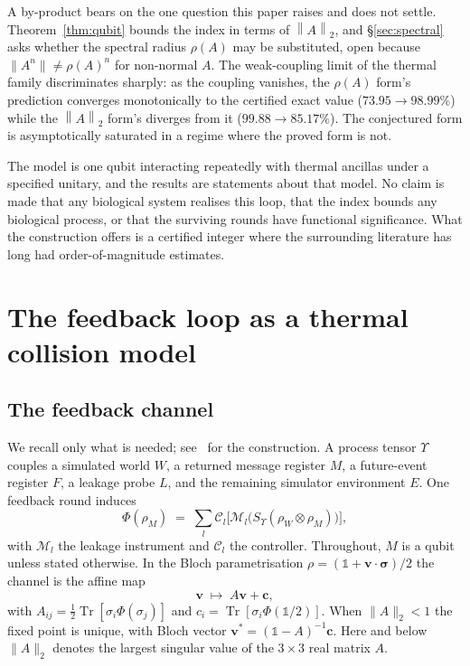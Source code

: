 \documentclass[11pt,a4paper]{article}
\theoremstyle{definition}
\theoremstyle{remark}
\DeclareMathOperator{\Tr}{Tr}
\newcommand{\openone}{\mathbb{1}}%
\newcommand{\opn}[1]{\left\lVert #1 \right\rVert_{2}}
\begin{document}
A by-product bears on the one question this paper raises and does not settle.
Theorem~\ref{thm:qubit} bounds the index in terms of $\opn{A}$, and
\S\ref{sec:spectral} asks whether the spectral radius $\rho(A)$ may be
substituted, open because $\lVert A^n\rVert \neq \rho(A)^n$ for non-normal
$A$. The weak-coupling limit of the thermal family discriminates sharply: as
the coupling vanishes, the $\rho(A)$ form's prediction converges monotonically
to the certified exact value ($73.95 \to 98.99\%$) while the $\opn{A}$ form's
diverges from it ($99.88 \to 85.17\%$). The conjectured form is asymptotically
saturated in a regime where the proved form is not.

The model is one qubit interacting repeatedly with thermal ancillas under a
specified unitary, and the results are statements about that model. No claim
is made that any biological system realises this loop, that the index bounds
any biological process, or that the surviving rounds have functional
significance. What the construction offers is a certified integer where the
surrounding literature has long had order-of-magnitude estimates.


\section{The feedback loop as a thermal collision model}\label{sec:setup}\label{sec:model}

\subsection{The feedback channel}



We recall only what is needed; see~\cite{PaperI} for the construction. A
process tensor $\Upsilon$ couples a simulated world $W$, a returned message
register $M$, a future-event register $F$, a leakage probe $L$, and the
remaining simulator environment $E$. One feedback round induces
\begin{equation}\label{eq:channel}
  \Phi(\rho_{M})\;=\;\sum_{l}\mathcal{C}_{l}\bigl[\mathcal{M}_{l}
    \bigl(S_{\Upsilon}(\rho_{W}\otimes\rho_{M})\bigr)\bigr],
\end{equation}
with $\mathcal{M}_{l}$ the leakage instrument and $\mathcal{C}_{l}$ the
controller. Throughout, $M$ is a qubit unless stated otherwise. In the Bloch
parametrisation $\rho=(\openone+\bm{v}\cdot\bm{\sigma})/2$ the channel is the
affine map
\begin{equation}\label{eq:bloch}
  \bm{v}\;\longmapsto\;A\bm{v}+\bm{c},
\end{equation}
with $A_{ij}=\tfrac12\Tr[\sigma_i\Phi(\sigma_j)]$ and
$c_i=\Tr[\sigma_i\Phi(\openone/2)]$.
When $\|A\|_{2}<1$ the fixed point is unique, with Bloch vector
$\bm{v}^{\ast}=(\openone-A)^{-1}\bm{c}$. Here and below $\|A\|_{2}$ denotes the
largest singular value of the $3\times3$ real matrix $A$.
\end{document}

